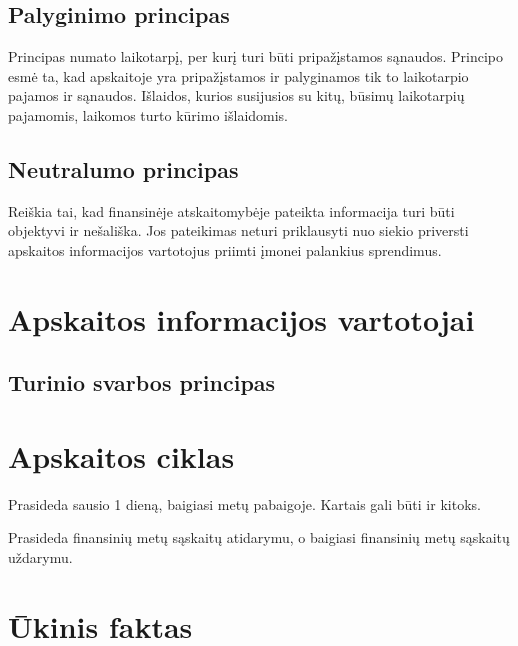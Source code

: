\subsection{Palyginimo principas}


Principas numato laikotarpį, per kurį turi būti pripažįstamos sąnaudos.
Principo esmė ta, kad apskaitoje yra pripažįstamos ir palyginamos
tik to laikotarpio pajamos ir sąnaudos. Išlaidos, kurios susijusios
su kitų, būsimų laikotarpių pajamomis, laikomos turto kūrimo išlaidomis.

\subsection{Neutralumo principas}


Reiškia tai, kad finansinėje atskaitomybėje pateikta informacija turi
būti objektyvi ir nešališka. Jos pateikimas neturi priklausyti
nuo siekio priversti apskaitos informacijos vartotojus priimti
įmonei palankius sprendimus.

\section{Apskaitos informacijos vartotojai}








\subsection{Turinio svarbos principas}

\section{Apskaitos ciklas}


Prasideda sausio 1 dieną, baigiasi metų pabaigoje. Kartais gali būti
ir kitoks.

Prasideda finansinių metų sąskaitų atidarymu, o baigiasi
finansinių metų sąskaitų uždarymu.

\section{Ūkinis faktas}

